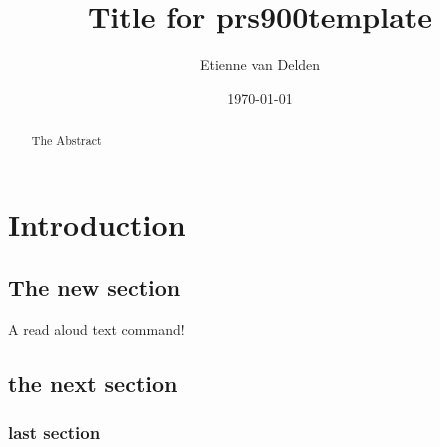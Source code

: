 \documentclass[9pt]{memoir}
\begin{document}
	
    
    \renewcommand{\contentsname}{Table of Contents} %
    
	\title{Title for prs900template}
	\author{Etienne van Delden}
	\date{\today}
    
    
   	\maketitle
    \thispagestyle{empty}
    
    \begin{figure}[b]
        \begin{abstract}
            The Abstract
        \end{abstract}
    \end{figure}

    \newpage
   \setcounter{tocdepth}{1}
    \tableofcontents*
    
    
        
	\mainmatter
	\chapter{Introduction}
	
        \section{The new section}\noindent    
        A read aloud text command!
         \lipsum[2-2]
        \section{the next section}
            \lipsum[3-4]
        \subsection{last section}
            \lipsum[4-5]
	
\end{document}
